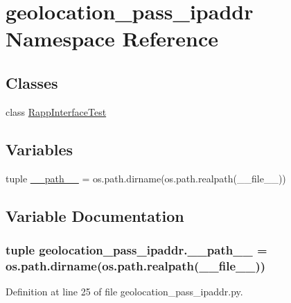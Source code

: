 \hypertarget{namespacegeolocation__pass__ipaddr}{\section{geolocation\-\_\-pass\-\_\-ipaddr Namespace Reference}
\label{namespacegeolocation__pass__ipaddr}
}
\subsection*{Classes}
\begin{DoxyCompactItemize}
\item 
class \hyperlink{classgeolocation__pass__ipaddr_1_1RappInterfaceTest}{Rapp\-Interface\-Test}
\end{DoxyCompactItemize}
\subsection*{Variables}
\begin{DoxyCompactItemize}
\item 
tuple \hyperlink{namespacegeolocation__pass__ipaddr_a37acfdf61a657fc0f1e6317ef5569743}{\-\_\-\-\_\-path\-\_\-\-\_\-} = os.\-path.\-dirname(os.\-path.\-realpath(\-\_\-\-\_\-file\-\_\-\-\_\-))
\end{DoxyCompactItemize}


\subsection{Variable Documentation}
\hypertarget{namespacegeolocation__pass__ipaddr_a37acfdf61a657fc0f1e6317ef5569743}{
\subsubsection[{\-\_\-\-\_\-path\-\_\-\-\_\-}]{\setlength{\rightskip}{0pt plus 5cm}tuple geolocation\-\_\-pass\-\_\-ipaddr.\-\_\-\-\_\-path\-\_\-\-\_\- = os.\-path.\-dirname(os.\-path.\-realpath(\-\_\-\-\_\-file\-\_\-\-\_\-))}}\label{namespacegeolocation__pass__ipaddr_a37acfdf61a657fc0f1e6317ef5569743}


Definition at line 25 of file geolocation\-\_\-pass\-\_\-ipaddr.\-py.

